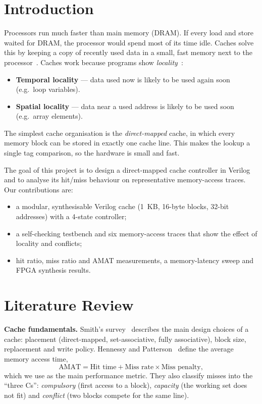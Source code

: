 \documentclass[conference]{IEEEtran}
\begin{document}
\section{Introduction}
Processors run much faster than main memory (DRAM). If every load and store waited for DRAM, the processor would
spend most of its time idle. Caches solve this by keeping a copy of recently used data in a small, fast memory next
to the processor~\cite{hennessy2017}. Caches work because programs show \emph{locality}~\cite{denning2005}:
\begin{itemize}
\item \textbf{Temporal locality} --- data used now is likely to be used again soon (e.g.\ loop variables).
\item \textbf{Spatial locality} --- data near a used address is likely to be used soon (e.g.\ array elements).
\end{itemize}
The simplest cache organisation is the \emph{direct-mapped} cache, in which every memory block can be stored in
exactly one cache line. This makes the lookup a single tag comparison, so the hardware is small and fast.

The goal of this project is to design a direct-mapped cache controller in Verilog and to analyse its hit/miss
behaviour on representative memory-access traces. Our contributions are:
\begin{itemize}
\item a modular, synthesisable Verilog cache (1~KB, 16-byte blocks, 32-bit addresses) with a 4-state controller;
\item a self-checking testbench and six memory-access traces that show the effect of locality and conflicts;
\item hit ratio, miss ratio and AMAT measurements, a memory-latency sweep and FPGA synthesis results.
\end{itemize}

\section{Literature Review}
\textbf{Cache fundamentals.} Smith's survey~\cite{smith1982} describes the main design choices of a cache:
placement (direct-mapped, set-associative, fully associative), block size, replacement and write policy. Hennessy
and Patterson~\cite{hennessy2017} define the average memory access time,
\begin{equation}
\text{AMAT} = \text{Hit time} + \text{Miss rate} \times \text{Miss penalty},
\label{eq:amat}
\end{equation}
which we use as the main performance metric. They also classify misses into the ``three Cs'':
\emph{compulsory} (first access to a block), \emph{capacity} (the working set does not fit) and
\emph{conflict} (two blocks compete for the same line).
\end{document}
